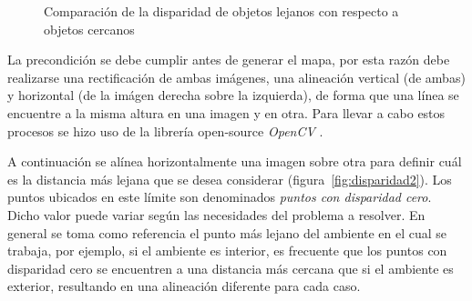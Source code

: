 \documentclass[journal]{IEEEtran}
\begin{document}
\begin{figure}[ht]
\centering
{}


\caption{Comparaci\'on de la disparidad de objetos lejanos con respecto a objetos cercanos}
\label{fig:disparidaddistancia}
\end{figure}

La precondici\'on se debe cumplir antes de generar el mapa, por esta raz\'on debe realizarse una rectificaci\'on de ambas im\'agenes, una alineaci\'on vertical (de ambas) y horizontal (de la im\'agen derecha sobre la izquierda), de forma que una l\'inea se encuentre a la misma altura en una imagen y en otra. Para llevar a cabo estos procesos se hizo uso de la librer\'ia open-source \emph{OpenCV} \cite{opencv}.

A continuaci\'on se al\'inea horizontalmente una imagen sobre otra para definir cu\'al es la distancia m\'as lejana que se desea considerar (figura~\ref{fig:disparidad2}). Los puntos ubicados en este l\'imite son denominados \emph{puntos con disparidad cero}. Dicho valor puede variar seg\'un las necesidades del problema a resolver. En general se toma como referencia el punto m\'as lejano del ambiente en el cual se trabaja, por ejemplo, si el ambiente es interior, es frecuente que los puntos con disparidad cero se encuentren a una distancia m\'as cercana que si el ambiente es exterior, resultando en una alineaci\'on diferente para cada caso.
\end{document}

